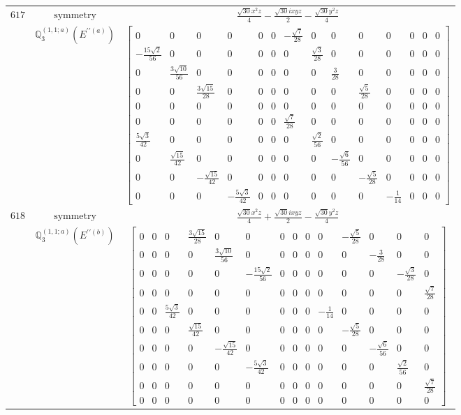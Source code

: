 \documentclass[fleqn,8pt,landscape]{jsarticle}
\begin{document}
\begin{longtable}{ccc}
$ 617 $ & $ \text{symmetry} $ & $ \frac{\sqrt{30} x^{2} z}{4} - \frac{\sqrt{30} i x y z}{2} - \frac{\sqrt{30} y^{2} z}{4} $ \\
$  $ & $ \mathbb{Q}_{3}^{(1,1;a)}(E^{\prime\prime(a)}) $ & $ \begin{bmatrix} 0 & 0 & 0 & 0 & 0 & 0 & - \frac{\sqrt{7}}{28} & 0 & 0 & 0 & 0 & 0 & 0 & 0 \\ - \frac{15 \sqrt{2}}{56} & 0 & 0 & 0 & 0 & 0 & 0 & \frac{\sqrt{3}}{28} & 0 & 0 & 0 & 0 & 0 & 0 \\ 0 & \frac{3 \sqrt{10}}{56} & 0 & 0 & 0 & 0 & 0 & 0 & \frac{3}{28} & 0 & 0 & 0 & 0 & 0 \\ 0 & 0 & \frac{3 \sqrt{15}}{28} & 0 & 0 & 0 & 0 & 0 & 0 & \frac{\sqrt{5}}{28} & 0 & 0 & 0 & 0 \\ 0 & 0 & 0 & 0 & 0 & 0 & 0 & 0 & 0 & 0 & 0 & 0 & 0 & 0 \\ 0 & 0 & 0 & 0 & 0 & 0 & \frac{\sqrt{7}}{28} & 0 & 0 & 0 & 0 & 0 & 0 & 0 \\ \frac{5 \sqrt{3}}{42} & 0 & 0 & 0 & 0 & 0 & 0 & \frac{\sqrt{2}}{56} & 0 & 0 & 0 & 0 & 0 & 0 \\ 0 & \frac{\sqrt{15}}{42} & 0 & 0 & 0 & 0 & 0 & 0 & - \frac{\sqrt{6}}{56} & 0 & 0 & 0 & 0 & 0 \\ 0 & 0 & - \frac{\sqrt{15}}{42} & 0 & 0 & 0 & 0 & 0 & 0 & - \frac{\sqrt{5}}{28} & 0 & 0 & 0 & 0 \\ 0 & 0 & 0 & - \frac{5 \sqrt{3}}{42} & 0 & 0 & 0 & 0 & 0 & 0 & - \frac{1}{14} & 0 & 0 & 0 \end{bmatrix} $ \\ \hline
$ 618 $ & $ \text{symmetry} $ & $ \frac{\sqrt{30} x^{2} z}{4} + \frac{\sqrt{30} i x y z}{2} - \frac{\sqrt{30} y^{2} z}{4} $ \\
$  $ & $ \mathbb{Q}_{3}^{(1,1;a)}(E^{\prime\prime(b)}) $ & $ \begin{bmatrix} 0 & 0 & 0 & \frac{3 \sqrt{15}}{28} & 0 & 0 & 0 & 0 & 0 & 0 & - \frac{\sqrt{5}}{28} & 0 & 0 & 0 \\ 0 & 0 & 0 & 0 & \frac{3 \sqrt{10}}{56} & 0 & 0 & 0 & 0 & 0 & 0 & - \frac{3}{28} & 0 & 0 \\ 0 & 0 & 0 & 0 & 0 & - \frac{15 \sqrt{2}}{56} & 0 & 0 & 0 & 0 & 0 & 0 & - \frac{\sqrt{3}}{28} & 0 \\ 0 & 0 & 0 & 0 & 0 & 0 & 0 & 0 & 0 & 0 & 0 & 0 & 0 & \frac{\sqrt{7}}{28} \\ 0 & 0 & \frac{5 \sqrt{3}}{42} & 0 & 0 & 0 & 0 & 0 & 0 & - \frac{1}{14} & 0 & 0 & 0 & 0 \\ 0 & 0 & 0 & \frac{\sqrt{15}}{42} & 0 & 0 & 0 & 0 & 0 & 0 & - \frac{\sqrt{5}}{28} & 0 & 0 & 0 \\ 0 & 0 & 0 & 0 & - \frac{\sqrt{15}}{42} & 0 & 0 & 0 & 0 & 0 & 0 & - \frac{\sqrt{6}}{56} & 0 & 0 \\ 0 & 0 & 0 & 0 & 0 & - \frac{5 \sqrt{3}}{42} & 0 & 0 & 0 & 0 & 0 & 0 & \frac{\sqrt{2}}{56} & 0 \\ 0 & 0 & 0 & 0 & 0 & 0 & 0 & 0 & 0 & 0 & 0 & 0 & 0 & \frac{\sqrt{7}}{28} \\ 0 & 0 & 0 & 0 & 0 & 0 & 0 & 0 & 0 & 0 & 0 & 0 & 0 & 0 \end{bmatrix} $ \\ \hline

\end{longtable}
\end{document}
